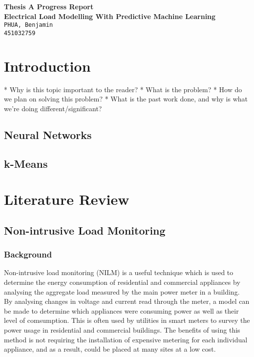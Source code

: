\documentclass[11pt,twocolumn]{article}
\begin{document}
	\begin{center}
		\textbf{\Large Thesis A Progress Report} \\\vspace{4mm}
		\textbf{\Large Electrical Load Modelling With Predictive Machine Learning} \\\vspace{4mm}
		\texttt{PHUA, Benjamin\\451032759}
	\end{center}

	\section{Introduction}
		* Why is this topic important to the reader?
		* What is the problem?
		* How do we plan on solving this problem?
		* What is the past work done, and why is what we're doing different/significant?

		\subsection{Neural Networks}
		\subsection{k-Means}

	\section{Literature Review}
		\subsection{Non-intrusive Load Monitoring}
			\subsubsection*{Background}
			Non-intrusive load monitoring (NILM) is a useful technique which is used to determine the energy consumption of residential and commercial appliances by analysing the aggregate load measured by the main power meter in a building. By analysing changes in voltage and current read through the meter, a model can be made to determine which appliances were consuming power as well as their level of comsumption. This is often used by utilities in smart meters to survey the power usage in residential and commercial buildings. The benefits of using this method is not requiring the installation of expensive metering for each individual appliance, and as a result, could be placed at many sites at a low cost. 
\end{document}
